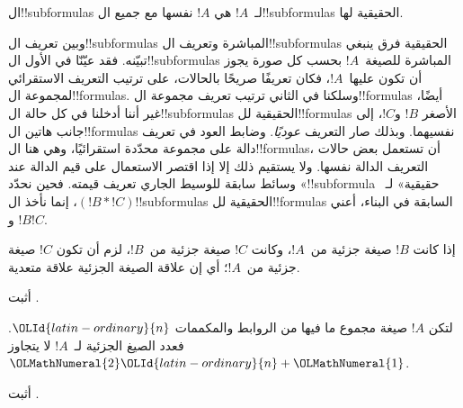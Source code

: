 \documentclass[../../../include/open-logic-section]{subfiles}
\begin{document}
\begin{defn}[!!^{subformula}]
ال!!{subformula}s لـ~$!A$ هي $!A$ نفسها مع جميع ال!!{subformula}s
الحقيقية لها.
\end{defn}

\begin{explain}
وبين تعريف ال!!{subformula}s المباشرة وتعريف ال!!{subformula}s
الحقيقية فرق ينبغي تبيّنه. فقد عيّنّا في الأول ال!!{subformula}s
المباشرة للصيغة~$!A$ بحسب كل صورة يجوز أن تكون عليها~$!A$، فكان
تعريفًا صريحًا بالحالات، على ترتيب التعريف الاستقرائي لمجموعة
ال!!{formula}s. وسلكنا في الثاني ترتيب تعريف مجموعة
ال!!{formula}s أيضًا، غير أننا أدخلنا في كل حالة ال!!{subformula}s
الحقيقية لل!!{formula}s الأصغر $!B$ و$!C$، إلى جانب هاتين
ال!!{formula}s نفسيهما. وبذلك صار التعريف \emph{عوديًا}.
وضابط العود في تعريف دالة على مجموعة محدّدة استقرائيًا، وهي هنا
ال!!{formula}s، أن تستعمل بعض حالات التعريف الدالة نفسها.
ولا يستقيم ذلك إلا إذا اقتصر الاستعمال على قيم الدالة عند وسائط
سابقة للوسيط الجاري تعريف قيمته. فحين نحدّد «!!{subformula} حقيقية»
لـ~$(!B \ast !C)$، إنما نأخذ ال!!{subformula}s الحقيقية
لل!!{formula}s السابقة في البناء، أعني $!B$ و$!C$.
\end{explain}

\begin{prop}
إذا كانت $!B$ صيغة جزئية من~$!A$، وكانت $!C$ صيغة جزئية من~$!B$،
لزم أن تكون $!C$ صيغة جزئية من~$!A$؛ أي إن علاقة الصيغة
الجزئية علاقة متعدية.
\end{prop}

\begin{prob}
أثبت .
\end{prob}

\begin{prop}
لتكن $!A$ صيغة مجموع ما فيها من الروابط والمكممات ${\OLId{latin-ordinary}{n}}$.
فعدد الصيغ الجزئية لـ~$!A$ لا يتجاوز ${\OLMathNumeral{2}}{\OLId{latin-ordinary}{n}}+{\OLMathNumeral{1}}$.
\end{prop}

\begin{prob}
أثبت .
\end{prob}
\end{document}
